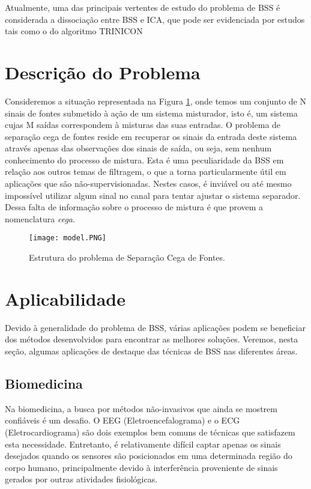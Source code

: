     
    Atualmente, uma das principais vertentes de estudo do problema de BSS é considerada a dissociação entre BSS e ICA, que pode ser evidenciada por estudos tais como o do algoritmo TRINICON \cite{trinicon}
    
\section{Descrição do Problema}
    
    Consideremos a situação representada na Figura \ref{fig:structure}, onde temos um conjunto de N sinais de fontes submetido à ação de um sistema misturador, isto é, um sistema cujas M saídas correspondem à misturas das suas entradas. O problema de separação cega de fontes reside em recuperar os sinais da entrada deste sistema através apenas das observações dos sinais de saída, ou seja, sem nenhum conhecimento do processo de mistura. Esta é uma peculiaridade da BSS em relação aos outros temas de filtragem, o que a torna particularmente útil em aplicações que são não-supervisionadas. Nestes casos, é inviável ou até mesmo impossível utilizar algum sinal no canal para tentar ajustar o sistema separador. Dessa falta de informação sobre o processo de mistura é que provem a nomenclatura \textit{cega}.
    
    \begin{figure}
       \hfill\texttt{[image: model.PNG]}\hspace*{\fill}
        \caption{Estrutura do problema de Separação Cega de Fontes.}
        \label{fig:structure}
    \end{figure}


\section{Aplicabilidade}
    Devido à generalidade do problema de BSS, várias aplicações podem se beneficiar dos métodos desenvolvidos para encontrar as melhores soluções. Veremos, nesta seção, algumas aplicações de destaque das técnicas de BSS nas diferentes áreas.
    
\subsection{Biomedicina}
    Na biomedicina, a busca por métodos não-invasivos que ainda se mostrem confiáveis é um desafio. O EEG (Eletroencefalograma) e o ECG (Eletrocardiograma) são dois exemplos bem comuns de técnicas que satisfazem esta necessidade. Entretanto, é relativamente difícil captar apenas os sinais desejados quando os sensores são posicionados em uma determinada região do corpo humano, principalmente devido à interferência proveniente de sinais gerados por outras atividades fisiológicas.
       
